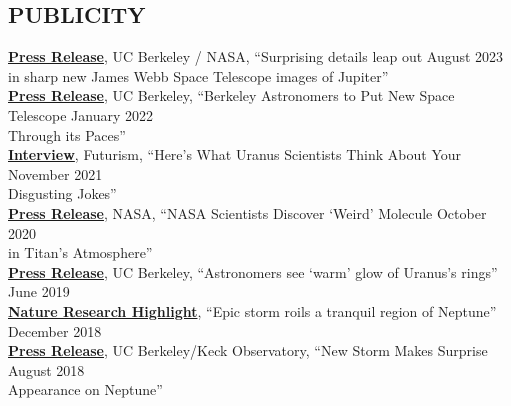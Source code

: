 \documentclass[margin, 10pt]{res} %
\newcommand\tab[1][1cm]{\hspace*{#1}}
\begin{document}
\begin{resume}


\section{PUBLICITY}



\href{https://news.berkeley.edu/2022/08/22/surprising-details-leap-out-in-sharp-new-james-webb-space-telescope-images-of-jupiter}{{\bf Press Release}}, UC Berkeley / NASA, ``Surprising details leap out \hfill August 2023 \\
\tab in sharp new James Webb Space Telescope images of Jupiter'' \\
\href{https://news.berkeley.edu/2022/01/25/berkeley-astronomers-to-put-new-space-telescope-through-its-paces/}{{\bf Press Release}}, UC Berkeley, ``Berkeley Astronomers to Put New Space Telescope \hfill January 2022 \\
\tab Through its Paces'' \\
\href{https://futurism.com/scientists-gross-uranus-jokes}{{\bf Interview}}, Futurism, ``Here's What Uranus Scientists Think About Your  \hfill November 2021 \\
\tab Disgusting Jokes''  \\
\href{https://www.nasa.gov/feature/goddard/2020/nasa-scientists-discover-a-weird-molecule-in-titan-s-atmosphere}{{\bf Press Release}}, NASA, ``NASA Scientists Discover `Weird' Molecule \hfill October 2020 \\
\tab in Titan's Atmosphere''  \\
\href{https://news.berkeley.edu/2019/06/20/astronomers-see-warm-glow-of-uranuss-rings/}{{\bf Press Release}}, UC Berkeley, ``Astronomers see `warm' glow of Uranus's rings'' \hfill June 2019 \\ 
\href{https://www.nature.com/articles/d41586-018-07622-4}{{\bf Nature Research Highlight}}, ``Epic storm roils a tranquil region of Neptune'' \hfill December 2018 \\
\href{http://www.keckobservatory.org/new_storm_makes_surprise_appearance_on_neptune/}{{\bf Press Release}}, UC Berkeley/Keck Observatory, ``New Storm Makes Surprise \hfill August 2018 \\
	\tab Appearance on Neptune'' \\ %


\end{resume}
\end{document}
